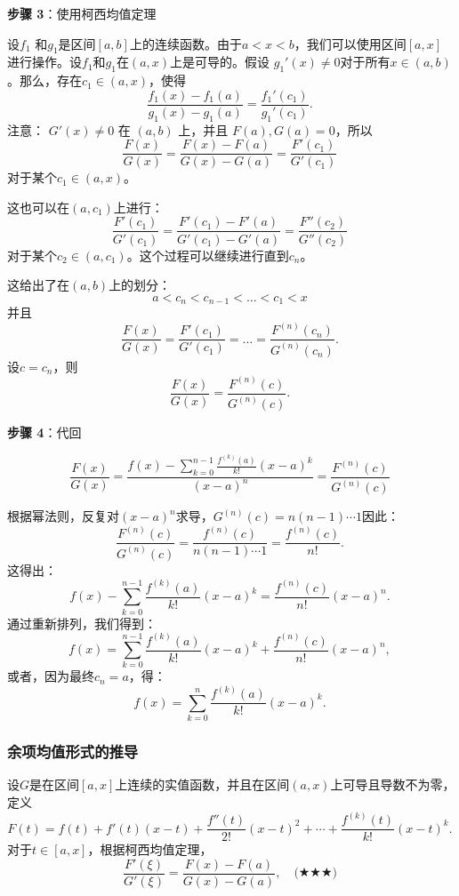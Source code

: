 \textbf{步骤 3}：使用柯西均值定理

设\( f_1 \) 和\( g_1 \)是区间\( [a, b] \)上的连续函数。由于\( a < x < b \)，我们可以使用区间\( [a, x] \) 进行操作。设\( f_1 \)和\( g_1 \)在\( (a, x) \)上是可导的。假设 \( g_1'(x) \neq 0 \)对于所有\( x \in (a, b) \)。那么，存在\( c_1 \in (a, x) \)，使得
\[
\frac{f_1(x) - f_1(a)}{g_1(x) - g_1(a)} = \frac{f_1'(c_1)}{g_1'(c_1)}.~
\]
注意： 
\( G'(x) \neq 0 \) 在 \( (a, b) \) 上，并且 \( F(a), G(a) = 0 \)，所以
\[
\frac{F(x)}{G(x)} = \frac{F(x) - F(a)}{G(x) - G(a)} = \frac{F'(c_1)}{G'(c_1)}~
\]
对于某个\( c_1 \in (a, x) \)。

这也可以在\( (a, c_1) \)上进行：
\[
\frac{F'(c_1)}{G'(c_1)} = \frac{F'(c_1) - F'(a)}{G'(c_1) - G'(a)} = \frac{F''(c_2)}{G''(c_2)}~
\]
对于某个\( c_2 \in (a, c_1) \)。这个过程可以继续进行直到\( c_n \)。

这给出了在\( (a, b) \)上的划分：
\[
a < c_n < c_{n-1} < \dots < c_1 < x~
\]
并且
\[
\frac{F(x)}{G(x)} = \frac{F'(c_1)}{G'(c_1)} = \dots = \frac{F^{(n)}(c_n)}{G^{(n)}(c_n)}.~
\]
设\( c = c_n \)，则
\[
\frac{F(x)}{G(x)} = \frac{F^{(n)}(c)}{G^{(n)}(c)}.~
\]

\textbf{步骤 4}：代回

\[
\frac{F(x)}{G(x)} = \frac{f(x) - \sum_{k=0}^{n-1} \frac{f^{(k)}(a)}{k!} (x - a)^k}{(x - a)^n} = \frac{F^{(n)}(c)}{G^{(n)}(c)}~
\]

根据幂法则，反复对\( (x - a)^n \)求导，\(G^{(n)}(c) = n(n - 1) \cdots 1\)因此：
\[
\frac{F^{(n)}(c)}{G^{(n)}(c)} = \frac{f^{(n)}(c)}{n(n - 1) \cdots 1} = \frac{f^{(n)}(c)}{n!}.~
\]
这得出：
\[
f(x) - \sum_{k=0}^{n-1} \frac{f^{(k)}(a)}{k!} (x - a)^k = \frac{f^{(n)}(c)}{n!} (x - a)^n.~
\]
通过重新排列，我们得到：
\[
f(x) = \sum_{k=0}^{n-1} \frac{f^{(k)}(a)}{k!} (x - a)^k + \frac{f^{(n)}(c)}{n!} (x - a)^n,~
\]
或者，因为最终\( c_n = a \)，得：
\[
f(x) = \sum_{k=0}^{n} \frac{f^{(k)}(a)}{k!} (x - a)^k.~
\]
\subsubsection{余项均值形式的推导}  
设\( G \)是在区间\( [a, x] \)上连续的实值函数，并且在区间\( (a, x) \)上可导且导数不为零，定义
\[
F(t) = f(t) + f'(t)(x - t) + \frac{f''(t)}{2!}(x - t)^2 + \cdots + \frac{f^{(k)}(t)}{k!}(x - t)^k.~
\]
对于\( t \in [a, x] \)，根据柯西均值定理，
\[
\frac{F'(\xi)}{G'(\xi)} = \frac{F(x) - F(a)}{G(x) - G(a)},\quad \text{(★★★)}~
\]
